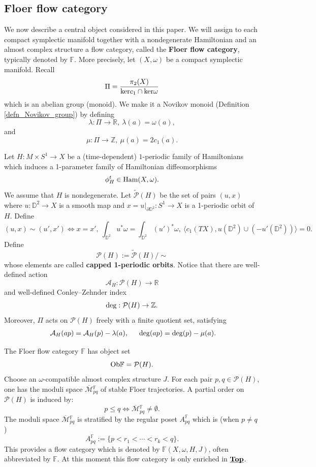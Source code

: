 \documentclass[reqno, 10pt]{amsart}
\numberwithin{equation}{section}
\numberwithin{equation}{section}
\theoremstyle{definition}
\theoremstyle{remark}
\newcommand{\beqn}{\begin{equation*}}
\newcommand{\eeqn}{\end{equation*}}
\newcommand{\ov}{\overline}
\newcommand{\mb}{\mathbb}
\newcommand{\mc}{\mathcal}
\newcommand{\uds}[1]{\underline{\smash{#1}}}
\begin{document}
\subsection{Floer flow category}

We now describe a central object considered in this paper. We will assign to each compact symplectic manifold together with a nondegenerate Hamiltonian and an almost complex structure a flow category, called the {\bf Floer flow category}, typically denoted by ${\mb F}$. More precisely, let $(X, \omega)$ be a compact symplectic manifold. Recall
\beqn
\Pi= \frac{ \pi_2(X)}{ {\rm ker} c_1 \cap {\rm ker} \omega}
\eeqn
which is an abelian group (monoid). We make it a Novikov monoid (Definition \ref{defn_Novikov_group}) by defining
\beqn
\lambda: \Pi \to {\mb R},\ \lambda(a) = \omega(a),
\eeqn
and
\beqn
\mu: \Pi \to {\mb Z},\ \mu(a) = 2 c_1(a).
\eeqn

Let $H: M \times S^1 \to X$ be a (time-dependent) $1$-periodic family of Hamiltonians which induces a 1-parameter family of Hamiltonian diffeomorphisms
\beqn
\phi_H^t \in {\rm Ham} (X, \omega).
\eeqn
We assume that $H$ is nondegenerate. Let $\tilde {\mc P}(H)$ be the set of pairs $(u, x)$ where $u: {\mb D}^2 \to X$ is a smooth map and $x = u|_{\partial \mb{D}^2}: S^1 \to X$ is a 1-periodic orbit of $H$. Define
\beqn
(u, x) \sim (u', x') \Longleftrightarrow x = x',\ \int_{{\mb D}^2} u^* \omega = \int_{{\mb D}^2} (u')^* \omega,\ \langle c_1(TX), u({\mb D}^2) \cup (-u' ({\mb D}^2)) \rangle = 0.
\eeqn
Define
\beqn
{\mc P}(H):= \tilde {\mc P}(H)/\sim
\eeqn
whose elements are called {\bf capped 1-periodic orbits}. Notice that there are well-defined action
\beqn
{\mc A}_H: {\mc P}(H) \to {\mb R}
\eeqn
and well-defined Conley--Zehnder index
\beqn
{\rm deg}: {\mc P}(H) \to {\mb Z}.
\eeqn
Moreover, $\Pi$ acts on ${\mc P}(H)$ freely with a finite quotient set, satisfying
\begin{align*}
&\ {\mc A}_H(ap) = {\mc A}_H(p) - \lambda(a),\ &\ {\rm deg}(ap) = {\rm deg} (p) - \mu(a).
\end{align*}

The Floer flow category ${\mb F}$ has object set
\beqn
{\rm Ob}{\mb F} = {\mc P}(H).
\eeqn
Choose an $\omega$-compatible almost complex structure $J$. For each pair $p, q \in {\mc P}(H)$, one has the moduli space $\ov{\mc M}{}_{pq}^{\mb F}$ of stable Floer trajectories. %
A partial order on ${\mc P}(H)$ is induced by:
\beqn
p\leq q \Longleftrightarrow \ov{\mc M}{}_{pq}^{\mb F} \neq \emptyset.
\eeqn
The moduli space $\ov{\mc M}{}_{pq}^{\mb F}$ is stratified by the regular poset $A_{pq}^{\mb F}$ which is (when $p \neq q$)
\beqn
A_{pq}^{\mb F}:= \{ p < r_1 < \cdots < r_k < q\}.
\eeqn
This provides a flow category which is denoted by $\mb{F}(X, \omega, H, J)$, often abbreviated by ${\mb F}$. At this moment this flow category is only enriched in $\uds{\bf Top}$.
\end{document}
